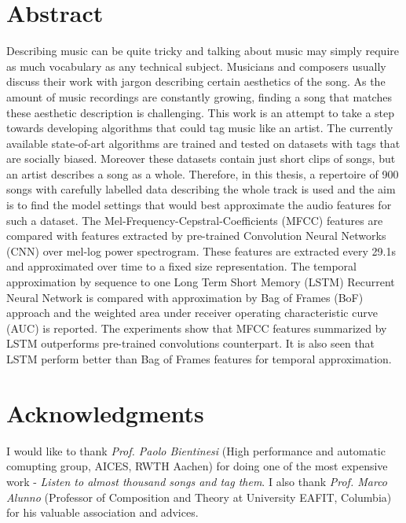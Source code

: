 \documentclass{book}
\begin{document}
\aicescoverpage


\section*{Abstract}

Describing music can be quite tricky and talking about music may simply require as much vocabulary as any technical subject. Musicians and composers usually discuss their work with jargon describing certain aesthetics of the song. As the amount of music recordings are constantly growing, finding a song that matches these aesthetic description is challenging. This work is an attempt to take a step towards developing algorithms that could tag music like an artist. The currently available state-of-art algorithms are trained and tested on datasets with tags that are socially biased. Moreover these datasets contain just short clips of songs, but an artist describes a song as a whole. Therefore, in this thesis, a repertoire of 900 songs with carefully labelled data describing the whole track is used and the aim is to find the model settings that would best approximate the audio features for such a dataset. The Mel-Frequency-Cepstral-Coefficients (MFCC) features are compared with features extracted by pre-trained Convolution Neural Networks (CNN) over mel-log power spectrogram. These features are extracted every 29.1s and approximated over time to a fixed size representation. The temporal approximation by sequence to one Long Term Short Memory (LSTM) Recurrent Neural Network is compared with approximation by Bag of Frames (BoF) approach and the weighted area under receiver operating characteristic curve (AUC) is reported. The experiments show that MFCC features summarized by LSTM outperforms pre-trained convolutions counterpart. It is also seen that LSTM perform better than Bag of Frames features for temporal approximation.     

\vspace{5cm}


\newpage

\section*{\bf Acknowledgments}
I would like to thank \textit{Prof. Paolo Bientinesi} (High performance and automatic comupting group, AICES, RWTH Aachen) for doing one of the most expensive work - \textit{Listen to almost thousand songs and tag them}. I also thank  \textit{Prof. Marco Alunno} (Professor of Composition and Theory at University EAFIT, Columbia) for his valuable association and advices.  
\tableofcontents
\end{document}
